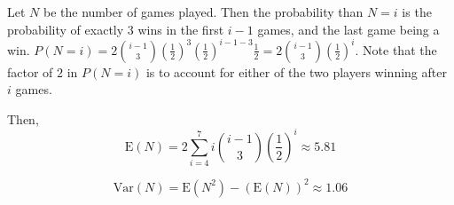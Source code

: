 Let $N$ be the number of games played. Then the probability than $N=i$ is the
probability of exactly $3$ wins in the first $i-1$ games, and the last game
being a win. $P(N=i) = 2\binom{i-1}{3}(\frac{1}{2})^{3}(\frac{1}{2})^{i-1-3}
\frac{1}{2} = 2\binom{i-1}{3}(\frac{1}{2})^{i}.$ Note that the factor of $2$ in
$P(N=i)$ is to account for either of the two players winning after $i$ games.

Then, $$\text{E}(N) = 2\sum_{i=4}^{7} i\binom{i-1}{3}(\frac{1}{2})^{i}
\approx
5.81$$

$$\text{Var}(N) = \text{E}(N^{2}) - (\text{E}(N))^{2} \approx 1.06$$